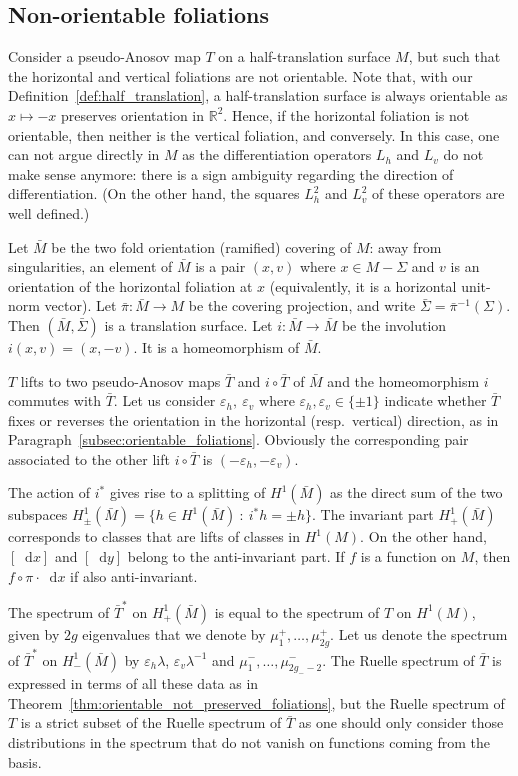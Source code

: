 \documentclass[11pt, a4paper, oneside, final, pagebackref]{amsart}
\newcommand{\R}{\mathbb{R}}
\newcommand{\dd}{\mathop{}\!\mathrm{d}}
\newcommand{\st}{\::\:}
\renewcommand{\epsilon}{\varepsilon}
\theoremstyle{definition}
\numberwithin{equation}{section}
\begin{document}
\subsection{Non-orientable foliations}

Consider a pseudo-Anosov map $T$ on a half-translation surface $M$, but such
that the horizontal and vertical foliations are not orientable. Note that,
with our Definition~\ref{def:half_translation}, a half-translation surface is
always orientable as $x \mapsto -x$ preserves orientation in $\R^2$. Hence,
if the horizontal foliation is not orientable, then neither is the vertical
foliation, and conversely. In this case, one can not argue directly in $M$ as
the differentiation operators $L_h$ and $L_v$ do not make sense anymore:
there is a sign ambiguity regarding the direction of differentiation. (On the
other hand, the squares $L_h^2$ and $L_v^2$ of these operators are well
defined.)

Let $\bar M$ be the two fold orientation (ramified) covering of $M$: away
from singularities, an element of $\bar M$ is a pair $(x, v)$ where $x \in
M-\Sigma$ and $v$ is an orientation of the horizontal foliation at $x$
(equivalently, it is a horizontal unit-norm vector). Let $\bar \pi : \bar M
\to M$ be the covering projection, and write $\bar \Sigma = \bar
\pi^{-1}(\Sigma)$. Then $(\bar M, \bar \Sigma)$ is a translation surface.
Let $i: \bar M \to \bar M$ be the involution $i(x,v) = (x, -v)$. It is a
homeomorphism of $\bar M$.

$T$ lifts to two pseudo-Anosov maps $\bar T$ and $i\circ \bar T$ of $\bar M$ and
the homeomorphism $i$ commutes with $\bar T$. Let us consider $\epsilon_h,\ \epsilon_v$
where $\epsilon_h, \epsilon_v \in \{\pm 1\}$ indicate whether $\bar T$ fixes or reverses
the orientation in the horizontal (resp.\ vertical) direction, as in Paragraph~\ref{subsec:orientable_foliations}.
Obviously the corresponding pair associated to the other lift $i\circ \bar T$ is $(-\epsilon_h,-\epsilon_v)$.

The action of $i^\ast$ gives rise to a splitting of $H^1(\bar M)$ as the
direct sum of the two subspaces $H^1_\pm(\bar M) = \{ h \in H^1(\bar M) \st
i^* h = \pm h\}$. The invariant part $H^1_+(\bar M)$ corresponds to classes
that are lifts of classes in $H^1(M)$. On the other hand, $[\dd x]$ and $[\dd
y]$ belong to the anti-invariant part. If $f$ is a function on $M$, then
$f\circ \pi \cdot \dd x$ if also anti-invariant.

The spectrum of $\bar T^*$ on $H^1_+(\bar M)$ is equal to the spectrum of $T$
on $H^1(M)$, given by $2g$ eigenvalues that we denote by $\mu_1^+,\dotsc,
\mu_{2g}^+$. Let us denote the spectrum of $\bar T^*$ on $H^1_-(\bar M)$ by
$\epsilon_h \lambda$, $\epsilon_v \lambda^{-1}$ and $\mu_1^-,\dotsc,
\mu_{2g_- -2}^-$. The
Ruelle spectrum of $\bar T$ is expressed in terms of all these data as in
Theorem~\ref{thm:orientable_not_preserved_foliations}, but the Ruelle
spectrum of $T$ is a strict subset of the Ruelle spectrum of $\bar T$ as one
should only consider those distributions in the spectrum that do not vanish
on functions coming from the basis.
\end{document}
